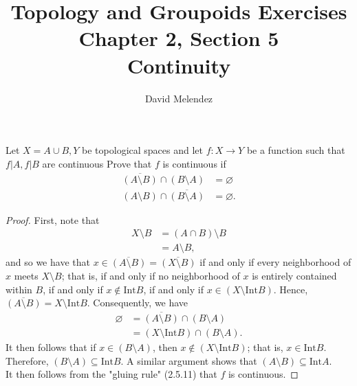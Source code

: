 \documentclass[12pt]{article}
\newenvironment{problem}[2][Problem]{\begin{trivlist}
\item[\hskip \labelsep {\bfseries #1}\hskip \labelsep {\bfseries #2.}]}{\end{trivlist}}
\newcommand{\Int}{\text{Int}}
\theoremstyle{remark}
\begin{document}
\title{Topology and Groupoids Exercises\\ \large Chapter 2, Section 5\\ 
\large Continuity}
\author{David Melendez}
\maketitle

\begin{problem}{5.3}
  Let $X=A\cup B,Y$ be topological spaces and let $f:X\to Y$ be a function such that $f|A,f|B$ 
  are continuous
  Prove that $f$ is continuous if
  \begin{align*}
    \overline{(A\setminus B)}\cap(B\setminus A)&=\varnothing\\
    (A\setminus B)\cap\overline{(B\setminus A)}&=\varnothing.
  \end{align*}
\end{problem}
\begin{proof}
  First, note that 
  \begin{align*}
    X\setminus B &= (A\cap B)\setminus B\\
    &= A\setminus B,
  \end{align*}
  and so we have that
  $x\in\overline{(A\setminus B)}
  =\overline{(X\setminus B)}$ if and only if every neighborhood of $x$
  meets $X\setminus B$; that is, if and only if no neighborhood of $x$ is entirely
  contained within $B$, if and only if $x\notin\Int{B}$, if and only if 
  $x\in (X\setminus\Int B)$.
  Hence, $\overline{(A\setminus B)} = X\setminus\Int B$.
  Consequently, we have
  \begin{align*}
    \varnothing &= \overline{(A\setminus B)}\cap(B\setminus A) \\
    &= (X\setminus\Int B)\cap(B\setminus A).
  \end{align*}
  \indent It then follows that if $x\in(B\setminus A)$, then $x\notin(X\setminus\Int B)$;
    that is, $x\in\Int B$.
    Therefore, $(B\setminus A)\subseteq\Int B$.
    A similar argument shows that $(A\setminus B)\subseteq\Int A$.\\
    \indent It then follows from the "gluing rule" (2.5.11) that $f$ is continuous.
\end{proof}
\end{document}
